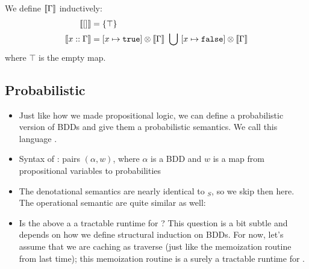 \documentclass{tufte-handout}
\begin{document}
\begin{itemize}
We define $\left \llbracket {\Gamma} \right \rrbracket$ inductively:
\begin{align*}
  \left \llbracket {[]} \right \rrbracket &= \{\top\} \\
  \left \llbracket {x :: \Gamma} \right \rrbracket &= [x \mapsto \texttt{true}] \otimes \left \llbracket {\Gamma} \right \rrbracket ~\bigcup~ 
    [x \mapsto \texttt{false}] \otimes \left \llbracket {\Gamma} \right \rrbracket
\end{align*}
where $\top$ is the empty map.
\end{itemize}

\subsection{Probabilistic \bdd{}}
\begin{itemize}
  \item Just like how we made propositional logic, we can define a probabilistic
  version of BDDs and give them a probabilistic semantics. We call this language
  \bdd{}. 
  \item Syntax of \bdd{}: pairs $(\alpha, w)$, where $\alpha$ is a BDD and $w$
  is a map from propositional variables to probabilities
  \item The denotational semantics are nearly identical to \prop$_S${}, so we skip 
  then here. The operational semantic are quite similar as well:
  
  \item Is the above a a tractable runtime for \bdd{}? 
  This question is a bit subtle and depends on how we
  define structural induction on BDDs. For now, let's assume that we are caching as 
  traverse (just like the memoization routine from last time); this memoization routine 
  is a surely a tractable runtime for \bdd{}.
\end{itemize}
\end{document}
